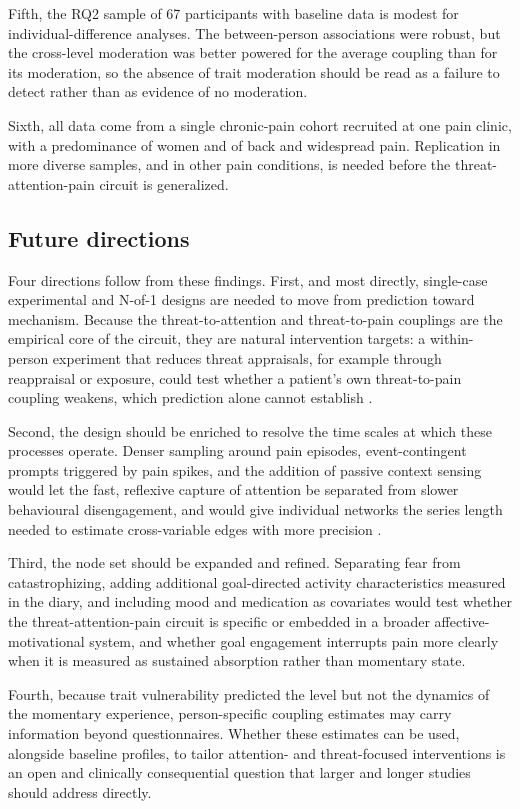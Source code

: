 \documentclass[11pt,a4paper]{article}
\begin{document}
Fifth, the RQ2 sample of 67 participants with baseline data is modest for individual-difference
analyses. The between-person associations were robust, but the cross-level moderation was better
powered for the average coupling than for its moderation, so the absence of trait moderation should
be read as a failure to detect rather than as evidence of no moderation.

Sixth, all data come from a single chronic-pain cohort recruited at one pain clinic, with a
predominance of women and of back and widespread pain. Replication in more diverse samples, and in
other pain conditions, is needed before the threat-attention-pain circuit is generalized.

\subsection{Future directions}
Four directions follow from these findings. First, and most directly, single-case experimental and
N-of-1 designs are needed to move from prediction toward mechanism. Because the threat-to-attention
and threat-to-pain couplings are the empirical core of the circuit, they are natural intervention
targets: a within-person experiment that reduces threat appraisals, for example through
reappraisal or exposure, could test whether a patient's own threat-to-pain coupling weakens, which
prediction alone cannot establish \citep{wright2020personalized,crombez2012fear}.

Second, the design should be enriched to resolve the time scales at which these processes operate.
Denser sampling around pain episodes, event-contingent prompts triggered by pain spikes, and the
addition of passive context sensing would let the fast, reflexive capture of attention be
separated from slower behavioural disengagement, and would give individual networks the series
length needed to estimate cross-variable edges with more precision \citep{beltz2016bridging}.

Third, the node set should be expanded and refined. Separating fear from catastrophizing, adding
additional goal-directed activity characteristics measured in the diary, and including
mood and medication as covariates would test whether the threat-attention-pain circuit is specific
or embedded in a broader affective-motivational system, and whether goal engagement interrupts pain
more clearly when it is measured as sustained absorption rather than momentary state.

Fourth, because trait vulnerability predicted the level but not the dynamics of the momentary
experience, person-specific coupling estimates may carry information beyond questionnaires. Whether
these estimates can be used, alongside baseline profiles, to tailor attention- and threat-focused
interventions is an open and clinically consequential question that larger and longer studies
should address directly.
\end{document}
